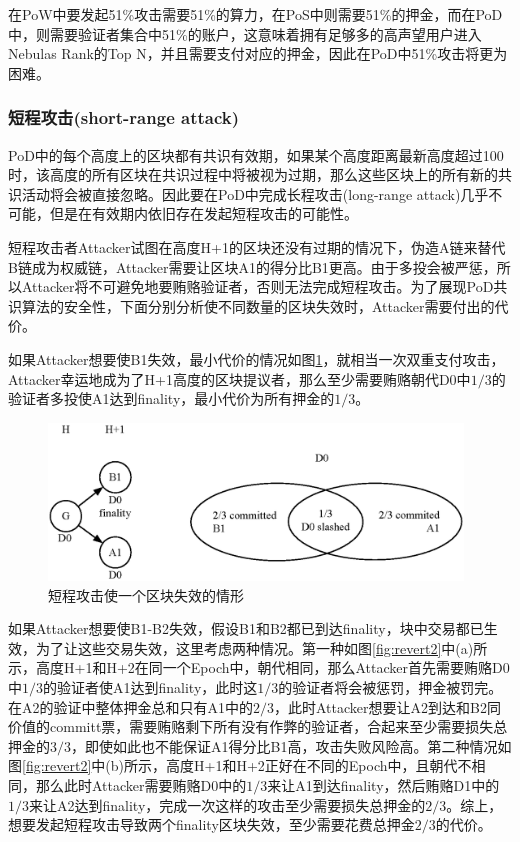 在PoW中要发起51\%攻击需要51\%的算力，在PoS中则需要51\%的押金，而在PoD中，则需要验证者集合中51\%的账户，这意味着拥有足够多的高声望用户进入Nebulas Rank的Top N，并且需要支付对应的押金，因此在PoD中51\%攻击将更为困难。

\subsubsection*{短程攻击(short-range attack)}
\label{pod:economic:fraud:short_range_attack}

PoD中的每个高度上的区块都有共识有效期，如果某个高度距离最新高度超过100时，该高度的所有区块在共识过程中将被视为过期，那么这些区块上的所有新的共识活动将会被直接忽略。因此要在PoD中完成长程攻击(long-range attack)几乎不可能，但是在有效期内依旧存在发起短程攻击的可能性。

短程攻击者Attacker试图在高度H+1的区块还没有过期的情况下，伪造A链来替代B链成为权威链，Attacker需要让区块A1的得分比B1更高。由于多投会被严惩，所以Attacker将不可避免地要贿赂验证者，否则无法完成短程攻击。为了展现PoD共识算法的安全性，下面分别分析使不同数量的区块失效时，Attacker需要付出的代价。

如果Attacker想要使B1失效，最小代价的情况如图\ref{fig:revert1}，就相当一次双重支付攻击，Attacker幸运地成为了H+1高度的区块提议者，那么至少需要贿赂朝代D0中$1/3$的验证者多投使A1达到finality，最小代价为所有押金的$1/3$。

\begin{figure}[h]
\centering
\includegraphics[width=11cm]{./figs/revert1}
\caption{短程攻击使一个区块失效的情形}
\label{fig:revert1}
\end{figure}

如果Attacker想要使B1-B2失效，假设B1和B2都已到达finality，块中交易都已生效，为了让这些交易失效，这里考虑两种情况。第一种如图\ref{fig:revert2}中(a)所示，高度H+1和H+2在同一个Epoch中，朝代相同，那么Attacker首先需要贿赂D0中$1/3$的验证者使A1达到finality，此时这$1/3$的验证者将会被惩罚，押金被罚完。在A2的验证中整体押金总和只有A1中的$2/3$，此时Attacker想要让A2到达和B2同价值的committ票，需要贿赂剩下所有没有作弊的验证者，合起来至少需要损失总押金的$3/3$，即使如此也不能保证A1得分比B1高，攻击失败风险高。第二种情况如图\ref{fig:revert2}中(b)所示，高度H+1和H+2正好在不同的Epoch中，且朝代不相同，那么此时Attacker需要贿赂D0中的$1/3$来让A1到达finality，然后贿赂D1中的$1/3$来让A2达到finality，完成一次这样的攻击至少需要损失总押金的$2/3$。综上，想要发起短程攻击导致两个finality区块失效，至少需要花费总押金$2/3$的代价。

